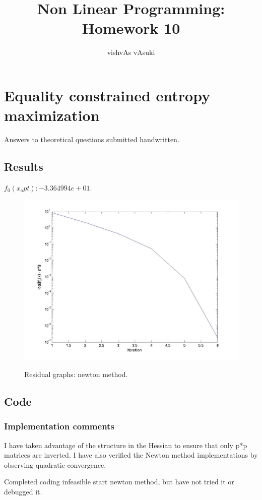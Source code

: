 \documentclass{article}
\title{Non Linear Programming: Homework 10}\author{vishvAs vAsuki}
\begin{document}
\maketitle
\section{Equality constrained entropy maximization}
Answers to theoretical questions submitted handwritten.

\subsection{Results}
$f_0(x_opt): -3.364994e+01$.

\begin{figure}[h]
\includegraphics[scale=0.25]{code/residualNewtonEq.jpg}
\label{fig:results}
\caption{Residual graphs: newton method.}
\end{figure}



\subsection{Code}
\subsubsection{Implementation comments}
I have taken advantage of the structure in the Hessian to ensure that only p*p matrices are inverted. I have also verified the Newton method implementations by observing quadratic convergence.

Completed coding infeasible start newton method, but have not tried it or debugged it.
\end{document}
